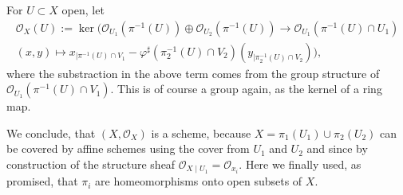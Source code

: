 \begin{exercise}{1}
\begin{enumerate}
{            For $U\subset X$ open, let 
            \begin{align*}
                \mathcal{O}_X(U):= \ker (\mathcal{O}_{U_1}(\pi^{-1}(U))\oplus
                \mathcal{O}_{U_2}(\pi^{-1}(U)) \to \mathcal{O}_{U_1}(\pi^{-1}(U)
                \cap U_1)\\ (x,y) \mapsto x_{\mid \pi^{-1}(U)\cap
                V_1}-\varphi^\sharp (\pi_2^{-1}(U)\cap V_2)(y_{\mid
                \pi_2^{-1}(U)\cap V_2}) ),
            \end{align*}
            where the substraction in the above term comes from the group
            structure of $\mathcal{O}_{U_1}(\pi^{-1}(U)\cap V_1)$. This is of
            course a group again, as the kernel of a ring map.

            We conclude, that $(X,\mathcal{O}_X)$ is a scheme, because
            $X=\pi_1(U_1)\cup \pi _2(U_2)$  can be covered by affine schemes
            using the cover from $U_1$ and $U_2$ and since by construction of
            the structure sheaf $\mathcal{O}_{X \mid U_1}=\mathcal{O}_{x_i}.$
            Here we finally used, as promised, that $\pi_i$ are homeomorphisms
            onto open subsets of $X$.
            }
    \end{enumerate}
\end{exercise}


